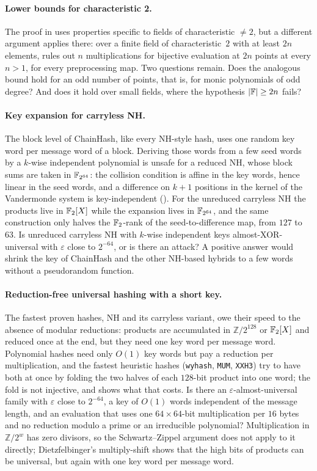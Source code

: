\paragraph{Lower bounds for characteristic 2.}
The proof in  uses properties specific to fields of characteristic
$\neq 2$, but a different argument applies there: over a finite field of characteristic~$2$
with at least $2n$ elements,  rules out $n$ multiplications for
bijective evaluation at $2n$ points at every $n>1$, for every preprocessing map.  Two
questions remain.  Does the analogous bound hold for an odd number of points, that is,
for monic polynomials of odd degree?  And does it hold over small fields, where the
hypothesis $\left\lvert \mathbb{F}\right\rvert\ge 2n$ fails?

\paragraph{Key expansion for carryless NH.}
The block level of ChainHash, like every NH-style hash, uses one random key
word per message word of a block.  Deriving those words from a few seed words
by a $k$-wise independent polynomial is unsafe for a reduced NH, whose block
sums are taken in $\mathbb{F}_{2^{64}}$: the collision condition is affine in the key
words, hence linear in the seed words, and a difference on $k+1$ positions in
the kernel of the Vandermonde system is key-independent
().  For the unreduced carryless NH the
products live in $\mathbb{F}_2[X]$ while the expansion lives in $\mathbb{F}_{2^{64}}$, and the
same construction only halves the $\mathbb{F}_2$-rank of the seed-to-difference map,
from $127$ to $63$.  Is unreduced carryless NH with $k$-wise independent keys
almost-XOR-universal with $\varepsilon$ close to $2^{-64}$, or is there an
attack?  A positive answer would shrink the key of ChainHash and the other NH-based hybrids to a few
words without a pseudorandom function.

\paragraph{Reduction-free universal hashing with a short key.}
The fastest proven hashes, NH and its carryless variant, owe their speed to
the absence of modular reductions: products are accumulated in $\mathbb
Z/2^{128}$ or $\mathbb{F}_2[X]$ and reduced once at the end, but they need one key
word per message word.  Polynomial hashes need only $O(1)$ key words but pay
a reduction per multiplication, and the fastest heuristic hashes
(\texttt{wyhash}, \texttt{MUM}, \texttt{XXH3}) try to have both at once by
folding the two halves of each $128$-bit product into one word; the fold is
not injective, and  shows what that costs.  Is there an
$\varepsilon$-almost-universal family with $\varepsilon$ close to $2^{-64}$,
a key of $O(1)$ words independent of the message length, and an evaluation
that uses one $64\times64$-bit multiplication per $16$ bytes and no reduction
modulo a prime or an irreducible polynomial?  Multiplication in $\mathbb
Z/2^{w}$ has zero divisors, so the Schwartz--Zippel argument does not apply
to it directly; Dietzfelbinger's multiply-shift shows that the high bits of
products can be universal, but again with one key word per message word.

